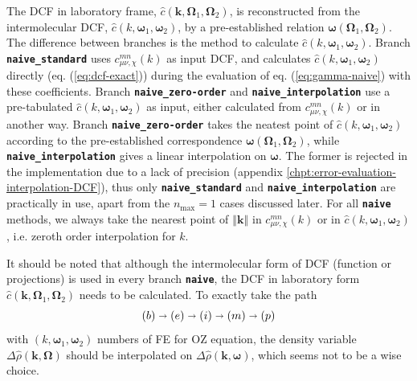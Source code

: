 The \acs{DCF} in laboratory frame, $\hat{c}(\mathbf{k},\mathbf{\Omega}_{1},\mathbf{\Omega}_{2})$,
is reconstructed from the intermolecular \acs{DCF}, $\hat{c}(k,\boldsymbol{\omega}_{1},\boldsymbol{\omega}_{2})$,
by a pre-established relation $\boldsymbol{\omega}(\mathbf{\Omega}_{1},\mathbf{\Omega}_{2})$.
The difference between branches is the method to calculate $\hat{c}(k,\boldsymbol{\omega}_{1},\boldsymbol{\omega}_{2})$.
Branch\textbf{ }\texttt{\textbf{naive\_standard}} uses $c_{\mu\nu,\chi}^{mn}(k)$
as input \acs{DCF}, and calculates $\hat{c}(k,\boldsymbol{\omega}_{1},\boldsymbol{\omega}_{2})$
directly (eq. (\ref{eq:dcf-exact})) during the evaluation of eq.
(\ref{eq:gamma-naive}) with these coefficients. Branch \texttt{\textbf{naive\_zero-order}}
and \texttt{\textbf{naive\_interpolation}} use a pre-tabulated $\hat{c}(k,\boldsymbol{\omega}_{1},\boldsymbol{\omega}_{2})$
as input, either calculated from $c_{\mu\nu,\chi}^{mn}(k)$ or in
another way. Branch \texttt{\textbf{naive\_zero-order}} takes the neatest
point of $\hat{c}(k,\boldsymbol{\omega}_{1},\boldsymbol{\omega}_{2})$
according to the pre-established correspondence $\boldsymbol{\omega}(\mathbf{\Omega}_{1},\mathbf{\Omega}_{2})$,
while \texttt{\textbf{naive\_interpolation}} gives a linear interpolation
on $\boldsymbol{\omega}$. The former is rejected in the implementation
due to a lack of precision (appendix \ref{chpt:error-evaluation-interpolation-DCF}),
thus only\textbf{ }\texttt{\textbf{naive\_standard}} and \texttt{\textbf{naive\_interpolation}}
are practically in use, apart from the $n_{\max}=1$ cases discussed
later. For all \texttt{\textbf{naive}} methods, we always take the
nearest point of $\left\Vert \mathbf{k}\right\Vert $ in $c_{\mu\nu,\chi}^{mn}(k)$
or in $\hat{c}(k,\boldsymbol{\omega}_{1},\boldsymbol{\omega}_{2})$,
i.e. zeroth order interpolation for $k$.

It should be noted that although the intermolecular form of \acs{DCF}
(function or projections) is used in every branch \texttt{\textbf{naive}},
the \acs{DCF} in laboratory form $\hat{c}(\mathbf{k},\mathbf{\Omega}_{1},\mathbf{\Omega}_{2})$
needs to be calculated. To exactly take the path
\[
\left(b\right)\shortrightarrow\left(e\right)\shortrightarrow\left(i\right)\shortrightarrow\left(m\right)\shortrightarrow\left(p\right)
\]
with $(k,\boldsymbol{\omega}_{1},\boldsymbol{\omega}_{2})$ numbers
of \acs{FE} for \acs{OZ} equation, the density variable $\Delta\hat{\rho}(\mathbf{k},\mathbf{\Omega})$
should be interpolated on $\Delta\hat{\rho}(\mathbf{k},\boldsymbol{\omega})$,
which seems not to be a wise choice.

